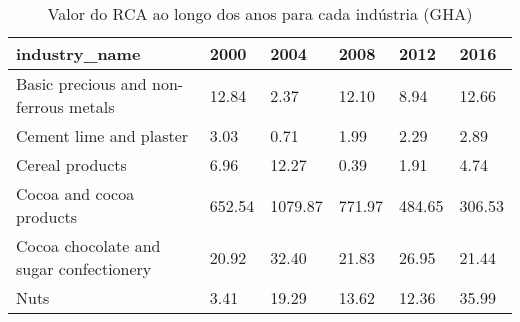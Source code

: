 \begin{table}
\centering
\caption{Valor do RCA ao longo dos anos para cada indústria (GHA)}
\begin{tabular}{p{6cm}p{1.5cm}p{1.5cm}p{1.5cm}p{1.5cm}p{1.5cm}}
\toprule
                          industry\_name &   2000 &    2004 &   2008 &   2012 &   2016 \\
\midrule
  Basic precious and non-ferrous metals &  12.84 &    2.37 &  12.10 &   8.94 &  12.66 \\
                Cement lime and plaster &   3.03 &    0.71 &   1.99 &   2.29 &   2.89 \\
                        Cereal products &   6.96 &   12.27 &   0.39 &   1.91 &   4.74 \\
               Cocoa and cocoa products & 652.54 & 1079.87 & 771.97 & 484.65 & 306.53 \\
Cocoa chocolate and sugar confectionery &  20.92 &   32.40 &  21.83 &  26.95 &  21.44 \\
                                   Nuts &   3.41 &   19.29 &  13.62 &  12.36 &  35.99 \\
\bottomrule
\end{tabular}
\end{table}
